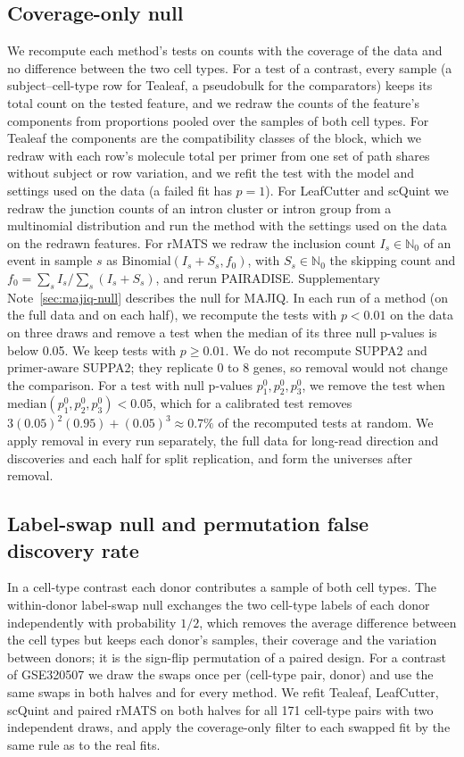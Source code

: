 \documentclass[11pt]{article}
\begin{document}
\subsection{Coverage-only null}
\label{sec:coverage-null}

We recompute each method's tests on counts with the coverage of the data and no difference between the two cell types. For a test of a contrast, every sample (a subject--cell-type row for Tealeaf, a pseudobulk for the comparators) keeps its total count on the tested feature, and we redraw the counts of the feature's components from proportions pooled over the samples of both cell types. For Tealeaf the components are the compatibility classes of the block, which we redraw with each row's molecule total per primer from one set of path shares without subject or row variation, and we refit the test with the model and settings used on the data (a failed fit has $p=1$). For LeafCutter and scQuint we redraw the junction counts of an intron cluster or intron group from a multinomial distribution and run the method with the settings used on the data on the redrawn features. For rMATS we redraw the inclusion count $I_s\in\mathbb N_0$ of an event in sample $s$ as $\mathrm{Binomial}(I_s+S_s,f_0)$, with $S_s\in\mathbb N_0$ the skipping count and $f_0=\sum_s I_s/\sum_s(I_s+S_s)$, and rerun PAIRADISE. Supplementary Note~\ref{sec:majiq-null} describes the null for MAJIQ. In each run of a method (on the full data and on each half), we recompute the tests with $p<0.01$ on the data on three draws and remove a test when the median of its three null p-values is below 0.05. We keep tests with $p\ge0.01$. We do not recompute SUPPA2 and primer-aware SUPPA2; they replicate 0 to 8 genes, so removal would not change the comparison. For a test with null p-values $p^0_1,p^0_2,p^0_3$, we remove the test when $\mathrm{median}(p^0_1,p^0_2,p^0_3)<0.05$, which for a calibrated test removes $3(0.05)^2(0.95)+(0.05)^3\approx0.7\%$ of the recomputed tests at random. We apply removal in every run separately, the full data for long-read direction and discoveries and each half for split replication, and form the universes after removal.

\subsection{Label-swap null and permutation false discovery rate}
\label{sec:label-swap}

In a cell-type contrast each donor contributes a sample of both cell types. The within-donor label-swap null exchanges the two cell-type labels of each donor independently with probability $1/2$, which removes the average difference between the cell types but keeps each donor's samples, their coverage and the variation between donors; it is the sign-flip permutation of a paired design. For a contrast of GSE320507 we draw the swaps once per (cell-type pair, donor) and use the same swaps in both halves and for every method. We refit Tealeaf, LeafCutter, scQuint and paired rMATS on both halves for all 171 cell-type pairs with two independent draws, and apply the coverage-only filter to each swapped fit by the same rule as to the real fits.
\end{document}
